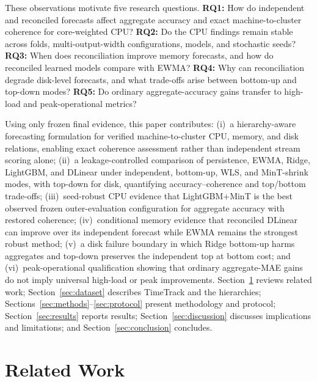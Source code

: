 \documentclass[a4paper,fleqn]{cas-dc}
\begin{document}
These observations motivate five research questions.
\textbf{RQ1:} How do independent and reconciled forecasts affect aggregate
accuracy and exact machine-to-cluster coherence for core-weighted {CPU}?
\textbf{RQ2:} Do the {CPU} findings remain stable across folds, multi-output-width
configurations, models, and stochastic seeds?
\textbf{RQ3:} When does reconciliation improve memory forecasts, and how do
reconciled learned models compare with {EWMA}?
\textbf{RQ4:} Why can reconciliation degrade disk-level forecasts, and what
trade-offs arise between bottom-up and top-down modes?
\textbf{RQ5:} Do ordinary aggregate-accuracy gains transfer to high-load and
peak-operational metrics?

Using only frozen final evidence, this paper contributes:
(i)~a hierarchy-aware forecasting formulation for verified machine-to-cluster
{CPU}, memory, and disk relations, enabling exact coherence assessment rather
than independent stream scoring alone;
(ii)~a leakage-controlled comparison of persistence, {EWMA}, Ridge, LightGBM,
and DLinear under independent, bottom-up, {WLS}, and MinT-shrink modes, with
top-down for disk, quantifying accuracy--coherence and top/bottom trade-offs;
(iii)~seed-robust {CPU} evidence that LightGBM+MinT is the best observed frozen
outer-evaluation configuration for aggregate accuracy with restored coherence;
(iv)~conditional memory evidence that reconciled DLinear can improve over its
independent forecast while {EWMA} remains the strongest robust method;
(v)~a disk failure boundary in which Ridge bottom-up harms aggregates and
top-down preserves the independent top at bottom cost; and
(vi)~peak-operational qualification showing that ordinary aggregate-{MAE} gains
do not imply universal high-load or peak improvements.
Section~\ref{sec:related} reviews related work;
Section~\ref{sec:dataset} describes TimeTrack and the hierarchies;
Sections~\ref{sec:methods}--\ref{sec:protocol} present methodology and protocol;
Section~\ref{sec:results} reports results;
Section~\ref{sec:discussion} discusses implications and limitations; and
Section~\ref{sec:conclusion} concludes.

\section{Related Work}
\label{sec:related}
\end{document}
